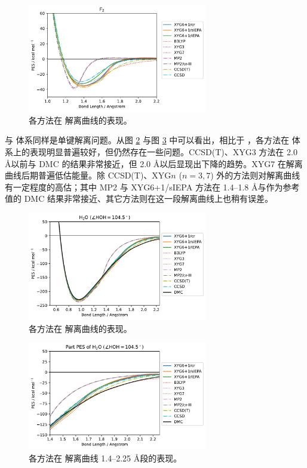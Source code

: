 \begin{figure}[h]
  \centering
  \includegraphics[width=0.7\textwidth]{assets/curve-F2.pdf}
  \caption[ 解离曲线表现]{各方法在  解离曲线的表现。}
  \label{fig.2.curve-F2}
\end{figure}

 与  体系同样是单键解离问题。从图 \ref{fig.2.curve-H2O} 与图 \ref{fig.2.curve-H2O-part} 中可以看出，相比于 ，各方法在  体系上的表现明显普遍较好，但仍然存在一些问题。CCSD(T)、XYG3 方法在 2.0 \AA 以前与 DMC 的结果非常接近，但 2.0 \AA 以后显现出下降的趋势。XYG7 在解离曲线后期普遍低估能量。除 CCSD(T)、XYG$n$ ($n=3, 7$) 外的方法则对解离曲线有一定程度的高估；其中 MP2 与 XYG6+1/sIEPA 方法在 1.4--1.8 \AA 与作为参考值的 DMC 结果非常接近、其它方法则在这一段解离曲线上也稍有误差。

\begin{figure}[h]
  \centering
  \includegraphics[width=0.7\textwidth]{assets/curve-H2O.pdf}
  \caption[ 解离曲线表现]{各方法在  解离曲线的表现。}
  \label{fig.2.curve-H2O}
\end{figure}

\begin{figure}[h]
  \centering
  \includegraphics[width=0.7\textwidth]{assets/curve-H2O-part.pdf}
  \caption[ 解离曲线 1.4--2.25 \AA 段表现]{各方法在  解离曲线 1.4--2.25 \AA 段的表现。}
  \label{fig.2.curve-H2O-part}
\end{figure}

